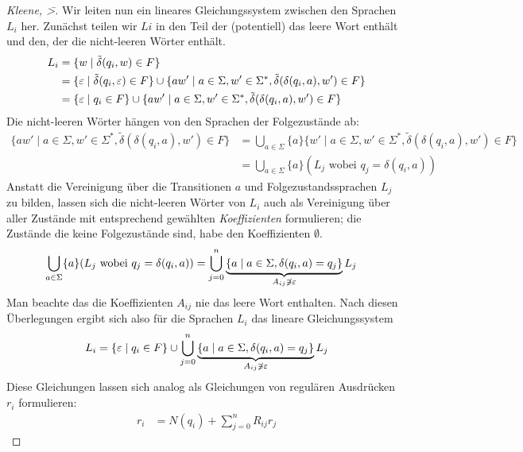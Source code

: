 {\begin{proof}[Kleene, \=>]
  Wir leiten nun ein lineares Gleichungssystem zwischen den Sprachen $L_i$ her.
  Zunächst teilen wir $Li$ in den Teil der (potentiell) das leere Wort enthält und den, der die nicht-leeren Wörter enthält.
  \begin{align*}
    L_i & =  \{ w \mid \tilde\delta(q_i,w)\in F \} \\
        & =  \{ \varepsilon \mid \tilde\delta(q_i, \varepsilon) \in F \} \cup \{a w' \mid a \in \Sigma, w' \in \Sigma^*, \tilde\delta(\delta(q_i, a), w') \in F\} \\
        & =  \{ \varepsilon \mid q_i \in F \} \cup \{a w' \mid a \in \Sigma, w' \in \Sigma^*, \tilde\delta(\delta(q_i, a), w') \in F\}
    \end{align*}
    Die nicht-leeren Wörter hängen von den Sprachen der Folgezustände ab:
    \begin{align*}
      \{a w' \mid a \in \Sigma, w' \in \Sigma^*, \tilde\delta(\delta(q_i, a), w') \in F\} & =
         \bigcup_{a \in \Sigma} \{a\} \{w' \mid a \in \Sigma, w' \in \Sigma^*, \tilde\delta(\delta(q_i, a), w') \in F\}
      \\
      & = \bigcup_{a \in \Sigma} \{a\} (L_j \text{ wobei  $q_j = \delta(q_i, a)$}) 
    \end{align*}
    Anstatt die Vereinigung über die Transitionen $a$ und Folgezustandssprachen $L_j$ zu bilden, lassen sich die nicht-leeren Wörter von $L_i$ auch als Vereinigung über aller Zustände mit entsprechend gewählten \emph{Koeffizienten} formulieren; die Zustände die keine Folgezustände sind, habe den Koeffizienten $\emptyset$.
    \begin{align*}
      \bigcup_{a \in \Sigma} \{a\} (L_j \text{ wobei  $q_j = \delta(q_i, a)$}) & = \bigcup_{j = 0}^{n} \underbrace{\{a \mid a \in \Sigma, \delta(q_i, a) = q_j\}}_{A_{ij} \not \ni \varepsilon} L_j
    \end{align*}
    Man beachte das die Koeffizienten $A_{ij}$ nie das leere Wort enthalten.
    Nach diesen Überlegungen ergibt sich also für die Sprachen $L_i$ das lineare Gleichungssystem
    \begin{displaymath}
      L_i = \{ \varepsilon \mid q_i \in F \} \cup \bigcup_{j = 0}^{n} \underbrace{\{a \mid a \in \Sigma, \delta(q_i, a) = q_j\}}_{A_{ij} \not \ni \varepsilon} L_j
    \end{displaymath}
    Diese Gleichungen lassen sich analog als Gleichungen von regulären Ausdrücken $r_i$ formulieren:
    \begin{align*}
      r_i &= N(q_i) + \sum_{j = 0}^n R_{ij} r_j
    \end{align*}

\end{proof}}
